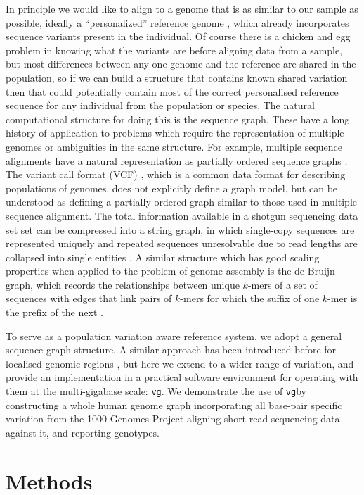 \documentclass[12pt]{article}
\newcommand{\vg}{{\tt vg}}
\begin{document}
In principle we would like to align to a genome that is as similar to our sample as possible, ideally a ``personalized'' reference genome \cite{Yuan_2012}, which already incorporates sequence variants present in the individual.  
Of course there is a chicken and egg problem in knowing what the variants are before aligning data from a sample, but most differences between any one genome and the reference are shared in the population, so if we can build a structure that contains known shared variation then that could potentially contain most of the correct personalised reference sequence for any individual from the population or species.
The natural computational structure for doing this is the sequence graph.
These have a long history of application to problems which require the representation of multiple genomes or ambiguities in the same structure.
For example, multiple sequence alignments have a natural representation as partially ordered sequence graphs \cite{lee2002POA}.
The variant call format (VCF) \cite{danecek2011}, which is a common data format for describing populations of genomes, does not explicitly define a graph model, but can be understood as defining a partially ordered graph similar to those used in multiple sequence alignment. 
The total information available in a shotgun sequencing data set set can be compressed into a string graph, in which single-copy sequences are represented uniquely and repeated sequences unresolvable due to read lengths are collapsed into single entities \cite{myers2005, simpson2010}.
A similar structure which has good scaling properties when applied to the problem of genome assembly is the de Bruijn graph, which records the relationships between unique $k$-mers of a set of sequences with edges that link pairs of $k$-mers for which the suffix of one $k$-mer is the prefix of the next \cite{iqbal2012}.

To serve as a population variation aware reference system, we adopt a general sequence graph structure. 
A similar approach has been introduced before for localised genomic regions \cite{prg2015}, but here we extend to a wider range of variation, and provide an implementation in a practical software environment for operating with them at the multi-gigabase scale: \vg. 
We demonstrate the use of \vg by constructing a whole human genome graph incorporating all base-pair specific variation from the 1000 Genomes Project \cite{1000g2015} aligning short read sequencing data against it, and reporting genotypes.

\section{Methods}
\end{document}
